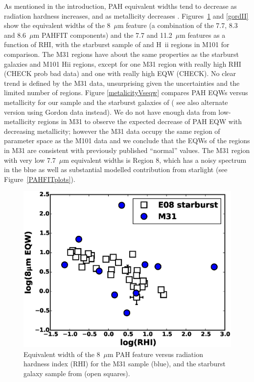 As mentioned in the introduction, PAH equivalent widths tend to decrease as radiation hardness increases,
and as metallicity decreases \citep{Calzetti:2010fk}.  
Figures~\ref{englII} and \ref{gordII} show the equivalent widths of the  8~$\mu$m feature 
(a combination of the 7.7, 8.3 and 8.6~$\mu$m PAHFIT components) and the 
 7.7 and 11.2~$\mu$m features as a function of RHI, with the starburst sample of \citet{Engelbracht_2008} 
and  H~{\sc ii} regions in M101 \citep{Gordon:2008lr} for comparison.
The M31 regions have about the same properties as the starburst galaxies and M101 H{\sc ii} regions, 
except for one M31 region with really high RHI (CHECK prob bad data) and one with really high EQW (CHECK).
No clear trend is defined by the M31 data, unsurprising given the uncertainties and the limited
number  of regions.
Figure \ref{metalicityVseqw} compares  PAH EQWs  versus  metallicity for our sample and the starburst 
galaxies of \citet{Engelbracht_2008} ( see also alternate version using Gordon data instead). 
We do not have enough data from low-metallicity regions in M31 to observe the expected decrease of PAH EQW with decreasing 
metallicity; however the M31 data occupy the same region of parameter space as the M101 data
and we conclude that the EQWs of the regions in M31 are consistent with previously published ``normal'' values.
The M31 region with very low  7.7~$\mu$m  equivalent widths is Region 8, which has
a noisy spectrum in the blue as well as substantial modelled contribution from starlight (see Figure~\ref{PAHFITplots}).


\begin{figure}
\centering
\includegraphics[scale=0.4]{./fig10_new.eps}
\caption{Equivalent width of the 8~$\mu$m PAH feature versus radiation hardness index (RHI) for the M31 sample (blue),
and the starburst galaxy sample from \citet{Engelbracht_2008} (open squares).
}
\label{englII}
\end{figure}

